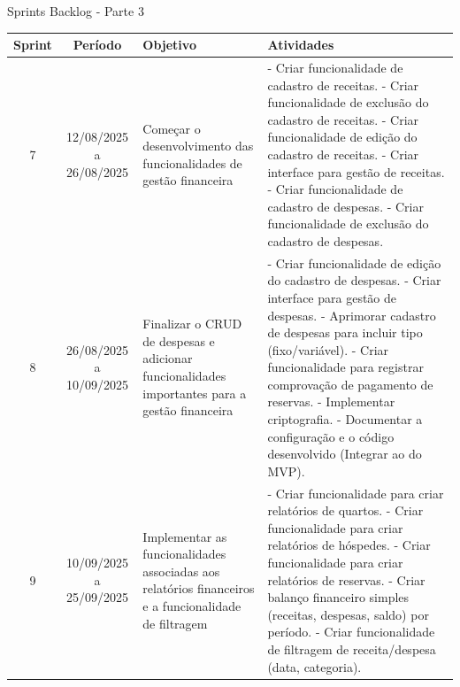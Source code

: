 \documentclass[
	12pt,				%
	openany,			%
	twoside,			%
	a4paper,			%
	english,			%
	french,				%
	spanish,			%
	brazil				%
	]{abntex2}
\begin{document}
\begin{quadro}[H]
	\caption{Sprints Backlog - Parte 3} 
	\label{sprints_backlog_3} 
	\begin{tabular}{|c|c|p{4cm}|p{6cm}|}
		\hline
		\textbf{Sprint} & \textbf{Período} & \textbf{Objetivo} & \textbf{Atividades} \\
		\hline	
		7 & 12/08/2025 a 26/08/2025 & Começar o desenvolvimento das funcionalidades de gestão financeira &
		- Criar funcionalidade de cadastro de receitas. \newline
		- Criar funcionalidade de exclusão do cadastro de receitas. \newline
		- Criar funcionalidade de edição do cadastro de receitas. \newline
		- Criar interface para gestão de receitas. \newline
		- Criar funcionalidade de cadastro de despesas. \newline
		- Criar funcionalidade de exclusão do cadastro de despesas. \\
		\hline
		8 & 26/08/2025 a 10/09/2025 & Finalizar o CRUD de despesas e adicionar funcionalidades importantes para a gestão financeira &
		- Criar funcionalidade de edição do cadastro de despesas. \newline
		- Criar interface para gestão de despesas. \newline
		- Aprimorar cadastro de despesas para incluir tipo (fixo/variável). \newline
		- Criar funcionalidade para registrar comprovação de pagamento de reservas. \newline
		- Implementar criptografia. \newline
		- Documentar a configuração e o código desenvolvido (Integrar ao do MVP). 	 \\
		\hline		
		9 & 10/09/2025 a 25/09/2025 & Implementar as funcionalidades associadas aos relatórios financeiros e a funcionalidade de filtragem &
		- Criar funcionalidade para criar relatórios de quartos. \newline
		- Criar funcionalidade para criar relatórios de hóspedes. \newline
		- Criar funcionalidade para criar relatórios de reservas. \newline
		- Criar balanço financeiro simples (receitas, despesas, saldo) por período. \newline
		- Criar funcionalidade de filtragem de receita/despesa (data, categoria). \\
		\hline
\end{tabular}
\end{quadro}	
\end{document}
